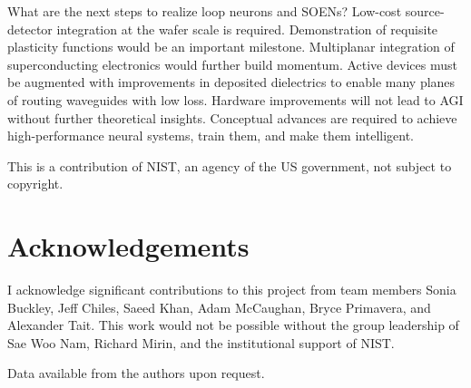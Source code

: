 \documentclass[twocolumn]{article}
\begin{document}
What are the next steps to realize loop neurons and SOENs? Low-cost source-detector integration at the wafer scale is required. Demonstration of requisite plasticity functions would be an important milestone. Multiplanar integration of superconducting electronics would further build momentum. Active devices must be augmented with improvements in deposited dielectrics to enable many planes of routing waveguides with low loss. Hardware improvements will not lead to AGI without further theoretical insights. Conceptual advances are required to achieve high-performance neural systems, train them, and make them intelligent.

\vspace{2em}
\noindent This is a contribution of NIST, an agency of the US government, not subject to copyright.

\section{\label{sec:acknowledgements}Acknowledgements}
I acknowledge significant contributions to this project from team members Sonia Buckley, Jeff Chiles, Saeed Khan, Adam McCaughan, Bryce Primavera, and Alexander Tait. This work would not be possible without the group leadership of Sae Woo Nam, Richard Mirin, and the institutional support of NIST.

\vspace{2em}
\noindent Data available from the authors upon request.



\end{document}
